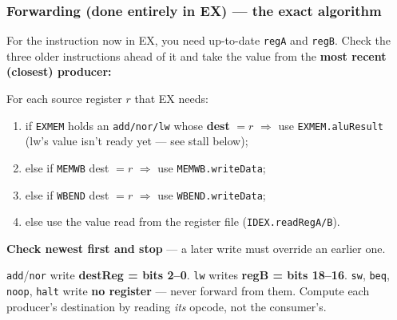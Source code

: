 \documentclass[10pt]{article}
\newcommand{\code}[1]{\texttt{\small #1}}
\begin{document}
\subsubsection{Forwarding (done entirely in EX) --- the exact algorithm}
For the instruction now in EX, you need up-to-date \code{regA} and \code{regB}. Check the three
older instructions ahead of it and take the value from the \textbf{most recent (closest) producer:}
\begin{formbox}
For each source register $r$ that EX needs:
\begin{enumerate}
\item if \code{EXMEM} holds an \code{add/nor/lw} whose \textbf{dest} $=r$ $\Rightarrow$ use \code{EXMEM.aluResult} (lw's value isn't ready yet --- see stall below);
\item else if \code{MEMWB} dest $=r$ $\Rightarrow$ use \code{MEMWB.writeData};
\item else if \code{WBEND} dest $=r$ $\Rightarrow$ use \code{WBEND.writeData};
\item else use the value read from the register file (\code{IDEX.readRegA/B}).
\end{enumerate}
\textbf{Check newest first and stop} --- a later write must override an earlier one.
\end{formbox}
\begin{pitbox}
\code{add}/\code{nor} write \textbf{destReg = bits 2--0}. \code{lw} writes \textbf{regB = bits 18--16}.
\code{sw}, \code{beq}, \code{noop}, \code{halt} write \textbf{no register} --- never forward from them.
Compute each producer's destination by reading \emph{its} opcode, not the consumer's.
\end{pitbox}
\end{document}
